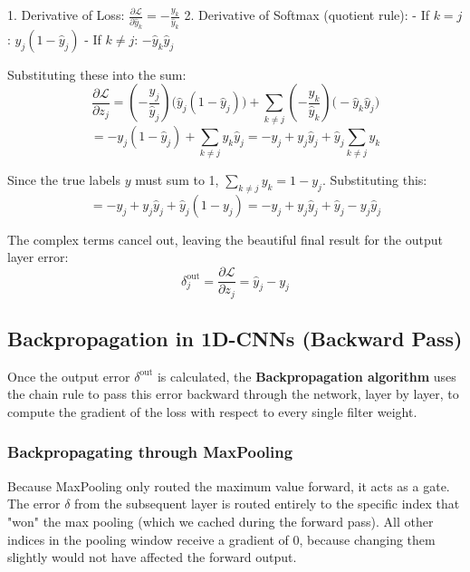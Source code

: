 1. Derivative of Loss: $\frac{\partial \mathcal{L}}{\partial \hat{y}_k} = -\frac{y_k}{\hat{y}_k}$
2. Derivative of Softmax (quotient rule): 
   - If $k = j$: $\hat{y}_j(1 - \hat{y}_j)$
   - If $k \neq j$: $-\hat{y}_k \hat{y}_j$

Substituting these into the sum:
\begin{equation*}
    \frac{\partial \mathcal{L}}{\partial z_j} = \left( -\frac{y_j}{\hat{y}_j} \right) \big( \hat{y}_j(1 - \hat{y}_j) \big) + \sum_{k \neq j} \left( -\frac{y_k}{\hat{y}_k} \right) \big( -\hat{y}_k \hat{y}_j \big)
\end{equation*}
\begin{equation*}
    = -y_j(1 - \hat{y}_j) + \sum_{k \neq j} y_k \hat{y}_j = -y_j + y_j \hat{y}_j + \hat{y}_j \sum_{k \neq j} y_k
\end{equation*}

Since the true labels $y$ must sum to 1, $\sum_{k \neq j} y_k = 1 - y_j$. Substituting this:
\begin{equation*}
    = -y_j + y_j \hat{y}_j + \hat{y}_j (1 - y_j) = -y_j + y_j \hat{y}_j + \hat{y}_j - y_j \hat{y}_j
\end{equation*}

The complex terms cancel out, leaving the beautiful final result for the output layer error:
\begin{equation}
    \delta_j^{\text{out}} = \frac{\partial \mathcal{L}}{\partial z_j} = \hat{y}_j - y_j
\end{equation}

\subsection{Backpropagation in 1D-CNNs (Backward Pass)}
Once the output error $\delta^{\text{out}}$ is calculated, the \textbf{Backpropagation algorithm} uses the chain rule to pass this error backward through the network, layer by layer, to compute the gradient of the loss with respect to every single filter weight.

\subsubsection{Backpropagating through MaxPooling}
Because MaxPooling only routed the maximum value forward, it acts as a gate. The error $\delta$ from the subsequent layer is routed entirely to the specific index that "won" the max pooling (which we cached during the forward pass). All other indices in the pooling window receive a gradient of 0, because changing them slightly would not have affected the forward output.

